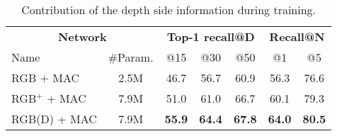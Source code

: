{
\setlength{\tabcolsep}{5pt}
\renewcommand{\arraystretch}{1.2}
\begin{table}
	\caption{\label{tab/eval_depth} Contribution of the depth side information during training.}
	\scriptsize \center
	\begin{tabular}{ l  c | c  c  c | c  c}
	\multicolumn{2}{c|}{\textbf{Network}} & \multicolumn{3}{c|}{\textbf{Top-1 recall@D}} & \multicolumn{2}{c}{\textbf{Recall@N}} \\	
	           Name & \#Param.  	& @15 & @30 & @50 & @1 & @5\\
	\hline
	RGB + MAC &  2.5M		& 46.7 & 56.7 & 60.9 & 56.3 & 76.6 \\
	RGB$^{+}$ + MAC & 7.9M	& 51.0 & 61.0 & 66.7 & 60.1 &  79.3 \\  
	RGB(D) + MAC &  7.9M	& \textbf{55.9} & \textbf{64.4} & \textbf{67.8} & \textbf{64.0} &  \textbf{80.5} \\
	\hline
	\end{tabular}
\end{table}
}